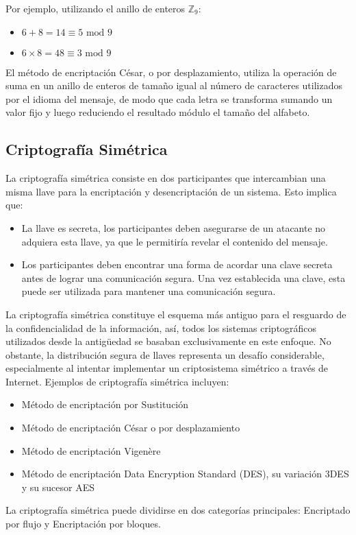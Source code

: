 Por ejemplo, utilizando el anillo de enteros $\mathbb{Z}_9$:
\begin{itemize}
    \item $6 + 8 = 14 \equiv 5 \text{ mod } 9$
    \item $6 \times 8 = 48 \equiv 3 \text{ mod } 9$
\end{itemize}

El método de encriptación César, o por desplazamiento, utiliza la operación de suma en un anillo de enteros de tamaño igual al número de caracteres utilizados por el idioma del mensaje, de modo que cada letra se transforma sumando un valor fijo y luego reduciendo el resultado módulo el tamaño del alfabeto.  

\subsection{Criptografía Simétrica}
La criptografía simétrica consiste en dos participantes que intercambian una misma llave para la encriptación y desencriptación de un sistema. 
Esto implica que: 
\begin{itemize}
    \item La llave es secreta, los participantes deben asegurarse de un atacante no adquiera esta llave, ya que le permitiría revelar el contenido del mensaje.
    \item Los participantes deben encontrar una forma de acordar una clave secreta antes de lograr una comunicación segura. Una vez establecida una clave, esta puede ser utilizada para mantener una comunicación segura.
\end{itemize}
La criptografía simétrica constituye el esquema más antiguo para el resguardo de la confidencialidad de la información, así, todos los sistemas criptográficos utilizados desde la antigüedad se basaban exclusivamente en este enfoque. No obstante, la distribución segura de llaves representa un desafío considerable, especialmente al intentar implementar un criptosistema simétrico a través de Internet.
Ejemplos de criptografía simétrica incluyen:
\begin{itemize}
    \item Método de encriptación por Sustitución
    \item Método de encriptación César o por desplazamiento
    \item Método de encriptación Vigenère
    \item Método de encriptación Data Encryption Standard (DES), su variación 3DES y su sucesor AES
\end{itemize}
La criptografía simétrica puede dividirse en dos categorías principales: Encriptado por flujo y Encriptación por bloques.
